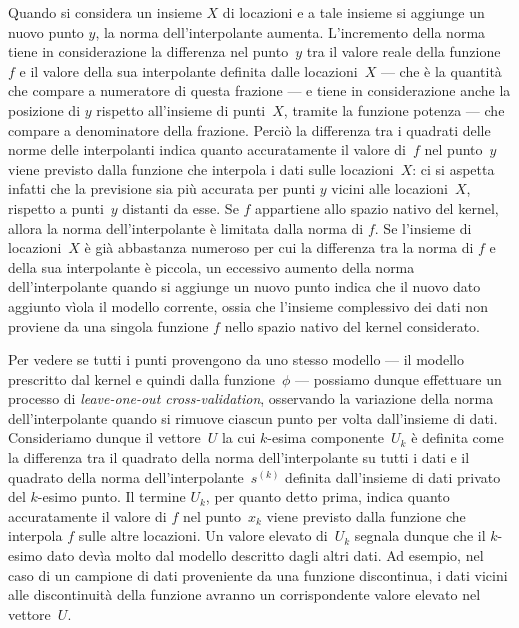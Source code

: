 Quando si considera un insieme $X$ di locazioni e a tale insieme si aggiunge un nuovo punto $y$, la norma dell'interpolante aumenta.  L'incremento della norma tiene in considerazione la differenza nel punto~$y$ tra il valore reale della funzione~$f$ e il valore della sua interpolante definita dalle locazioni~$X$ --- che è la quantità che compare a numeratore di questa frazione --- e tiene in considerazione anche la posizione di $y$ rispetto all'insieme di punti~$X$, tramite la funzione potenza --- che compare a denominatore della frazione.  Perciò la differenza tra i quadrati delle norme delle interpolanti indica quanto accuratamente il valore di~$f$ nel punto~$y$ viene previsto dalla funzione che interpola i dati sulle locazioni~$X$: ci si aspetta infatti che la previsione sia più accurata per punti $y$ vicini alle locazioni~$X$, rispetto a punti~$y$ distanti da esse.
Se $f$ appartiene allo spazio nativo del kernel, allora la  norma  dell’interpolante è limitata dalla norma di $f$.  Se l’insieme di locazioni~$X$ è già abbastanza numeroso per cui la differenza tra la norma di $f$ e della sua interpolante è piccola,  un eccessivo aumento della norma dell’interpolante quando si aggiunge un nuovo punto indica che il nuovo dato aggiunto vìola il modello corrente, ossia che l’insieme complessivo dei dati non proviene da una singola funzione $f$ nello spazio nativo del kernel considerato.


Per vedere se tutti i punti provengono da uno stesso modello --- il modello prescritto dal kernel e quindi dalla funzione~$\phi$ --- possiamo dunque effettuare un processo di {\em leave-one-out cross-validation}, osservando la variazione della norma dell’interpolante quando si rimuove ciascun punto per volta dall’insieme di dati.  Consideriamo dunque il vettore~$U$ la cui $k$-esima componente~$U_k$ è definita come la differenza tra il quadrato della norma dell’interpolante su tutti i dati e il quadrato della norma dell’interpolante~$s^{(k)}$ definita dall’insieme di dati privato del $k$-esimo punto.  Il termine $U_k$, per quanto detto prima, indica quanto accuratamente il valore di $f$ nel punto~$x_k$ viene previsto dalla funzione che interpola $f$ sulle altre locazioni.  Un valore elevato di~$U_k$ segnala dunque che il $k$-esimo dato devìa molto dal modello descritto dagli altri dati.  Ad esempio, nel caso di un campione di dati proveniente da una funzione discontinua, i dati vicini alle discontinuità della funzione avranno un corrispondente valore elevato nel vettore~$U$. 


